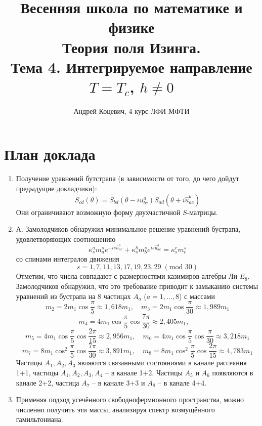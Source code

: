 \documentclass[12pt]{article}
\title{Весенняя школа по математике и физике
\\
Теория поля Изинга.\\
Тема 4. Интегрируемое направление $T=T_c$, $h\neq 0$}
\author{Андрей Коцевич, 4 курс ЛФИ МФТИ}
\date{}
\theoremstyle{definition}
\begin{document}
\maketitle
\section*{План доклада}
\begin{enumerate}
    \item Получение уравнений бутстрапа (в зависимости от того, до чего дойдут предыдущие докладчики):
    \begin{equation}
        S_{cd}(\theta)=S_{bd}(\theta-iu_{bc}^a)S_{ad}(\theta+i\hat{u}_{ac}^b)
    \end{equation}
    Они ограничивают возможную форму двухчастичной $S$-матрицы.
    \item А. Замолодчиков обнаружил минимальное решение уравнений бустрапа, удовлетворяющих соотношению
    \begin{equation}
        \kappa^a_sm^s_ae^{-is\bar{u}_{ac}^b}+\kappa^b_sm^s_be^{is\bar{u}_{ac}^b}=\kappa_s^cm_c^s
    \end{equation}
    со спинами интегралов движения
    \begin{equation}
        s=1,7,11,13,17,19,23,29\; (\text{mod } 30)
    \end{equation}
    Отметим, что числа совпадают с размерностями казимиров алгебры Ли $E_8$.\\
    Замолодчиков обнаружил, что это требование приводит к замыканию системы уравнений из бустрапа на 8 частицах $A_a$ ($a = 1,..., 8$) с массами
    \begin{equation}
        m_2=2m_1\cos\frac{\pi}{5}\approx1,618m_1,\quad m_3=2m_1\cos\frac{\pi}{30}\approx1,989m_1
    \end{equation}
    \begin{equation}
        m_4=4m_1\cos\frac{\pi}{5}\cos\frac{7\pi}{30}\approx2,405m_1,\quad 
    \end{equation}
    \begin{equation}
        m_5=4m_1\cos\frac{\pi}{5}\cos\frac{2\pi}{15}\approx2,956m_1,\quad m_6=4m_1\cos\frac{\pi}{5}\cos\frac{\pi}{30}\approx3,218m_1
    \end{equation}
    \begin{equation}
        m_7=8m_1\cos^2\frac{\pi}{5}\cos\frac{7\pi}{30}\approx3,891m_1,\quad m_8=8m_1\cos^2\frac{\pi}{5}\cos\frac{2\pi}{15}\approx4,783m_1
    \end{equation}
    Частицы $A_1,A_2,A_3$ являются связанными состояниями в канале рассеяния 1+1, частицы $A_1,A_2,A_3,A_4$ -- в канале 1+2. Частицы $A_5$ и $A_6$ появляются в канале 2+2, частица $A_7$ -- в канале 3+3 и $A_8$ -- в канале 4+4. 
    \item Применяя подход усечённого свободнофермионного пространства, можно численно получить эти массы, анализируя спектр возмущённого гамильтониана.
\end{enumerate}
\end{document}
